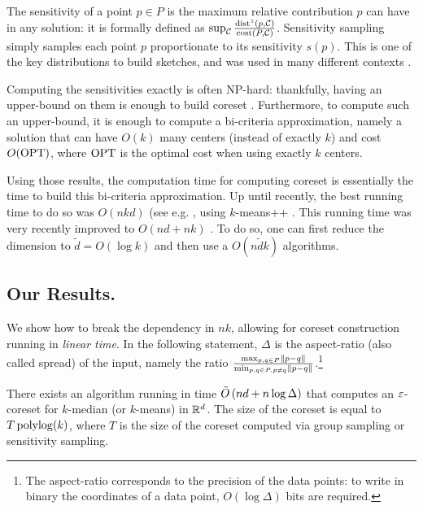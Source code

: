 The sensitivity of a point $p \in P$ is the maximum relative contribution $p$ can have in any solution: it is formally defined as $\sup_{\mathcal C} \frac{\operatorname{dist}^z(p, \mathcal C)}{\operatorname{cost}(P, \mathcal C)}$. 
Sensitivity sampling simply samples each point $p$ proportionate to its sensitivity $s(p)$. This is one of the key distributions to build sketches, and was used in many different contexts \cite{FeldmanL11, CohenP15}.

Computing the sensitivities exactly is often NP-hard: thankfully, having an upper-bound on them is enough to build coreset \cite{varadarajan12}. Furthermore, to compute such an upper-bound, it is enough to compute a bi-criteria approximation, namely a solution that can have $O(k)$ many centers (instead of exactly $k$) and cost $O(\text{OPT})$, where $\text{OPT}$ is the optimal cost when using exactly $k$ centers. 

Using those results, the computation time for computing coreset is essentially the time to build this bi-criteria approximation. 
Up until recently, the best running time to do so was $O(nkd)$ (see e.g. \cite{HuangV20, stoc21}, using $k$-means++ \cite{ArV07}. This running time was very recently improved to $O(nd + nk)$ \cite{deng2022nearly}. 
To do so, one can first reduce the dimension to $\tilde d = O(\log k)$ and then use a $O(n \tilde d k)$ algorithms. 

\subsection{Our Results.}

We show how to break the dependency in $nk$, allowing for coreset construction running in \textit{linear time}. In the following statement, $\Delta$ is the aspect-ratio (also called spread) of the input, namely the ratio $\frac{\max_{p, q \in P} \left\| p-q\right\|}{\min_{p, q \in P, p \neq q} \left\| p-q\right\|}$.\footnote{The aspect-ratio corresponds to the precision of the data points: to write in binary the coordinates of a data point, $O(\log \Delta)$ bits are required.}

\begin{theorem}\label{thm:main}
There exists an algorithm running in time $\tilde O\left( nd + n \log \Delta\right)$  that computes an $\varepsilon$-coreset for $k$-median (or $k$-means) in $\mathbb{R}^d$. The size of the coreset is equal to $T \operatorname{polylog}(k)$, where $T$ is the size of the coreset computed via group sampling or sensitivity sampling.
\end{theorem}

